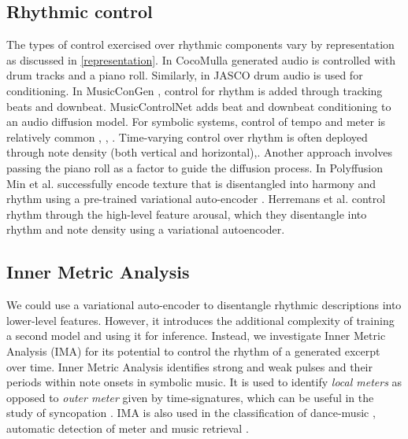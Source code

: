 \subsection{Rhythmic control} \label{section:rhytmic_weight}
The types of control exercised over rhythmic components vary by representation as discussed in \ref{representation}. In CocoMulla \cite{Lin_cocomulla_2024} generated audio is controlled with drum tracks and a piano roll. Similarly, in JASCO\cite{Tal_jasco} drum audio is used for conditioning. In MusicConGen \cite{Lan_Hsiao_Cheng_Yang_musicongen_2024}, control for rhythm is added through tracking beats and downbeat. MusicControlNet\cite{Wu_Donahue_musicontrolnet_2023} adds beat and downbeat conditioning to an audio diffusion model.
For symbolic systems, control of tempo and meter is relatively common \cite{Rütte_figaro_2023}, \cite{Huang_Yang_remi_pop_transformer_2020}, \cite{Lu_Xu_Kang_Yu_Xing_Tan_Bian_MuseCoco_2023}. Time-varying control over rhythm is often deployed through note density (both vertical and horizontal)\cite{Rütte_figaro_2023},\cite{Huang_rule_diffusion_2024}. Another approach \cite{Zhu_Liu_Jiang_Zheng_texture_2024} involves passing the piano roll as a factor to guide the diffusion process. In Polyffusion\cite{Min_Jiang_Xia_Zhao_polyffusion_2023} Min et al. successfully encode texture that is disentangled into harmony and rhythm using a pre-trained variational auto-encoder \cite{Wang_vae_chord_rhythm_2020}. Herremans et al. \cite{Tan_Herremans_2020} control rhythm through the high-level feature arousal, which they disentangle into rhythm and note density using a variational autoencoder. 

\subsection{Inner Metric Analysis} 
We could use a variational auto-encoder to disentangle rhythmic descriptions into lower-level features. However, it introduces the additional complexity of training a second model and using it for inference. Instead, we investigate Inner Metric Analysis (IMA) for its potential to control the rhythm of a generated excerpt over time. Inner Metric Analysis identifies strong and weak pulses and their periods within note onsets in symbolic music. It is used to identify \textit{local meters} as opposed to \textit{outer meter} given by time-signatures, which can be useful in the study of syncopation \cite{Bemman2024}\cite{Volk2008Syncopation}. IMA is also used in the classification of dance-music \cite{Chew_Volk_Lee_Dance_metric_weight_2005}, automatic detection of meter \cite{Haas_Volk_2016} and music retrieval \cite{Volk_Garbers_VanKranenburg_Wiering_Grijp_Veltkamp_2009}. 

